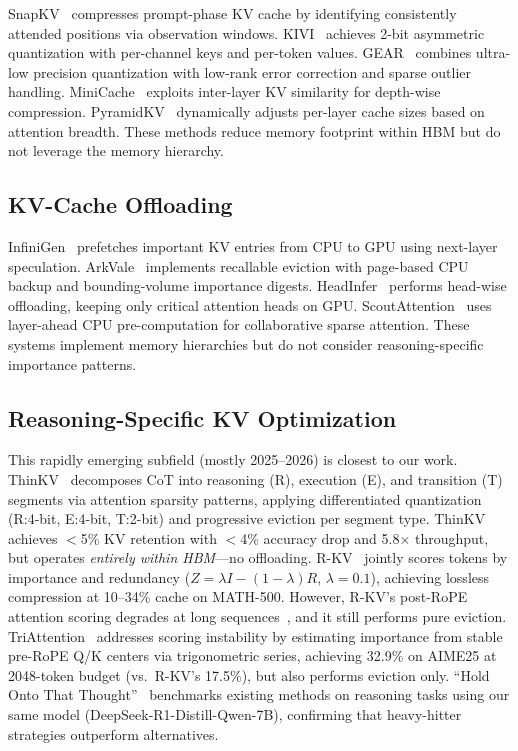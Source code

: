 \documentclass{article}
\begin{document}
SnapKV~\cite{snapkv} compresses prompt-phase KV cache by identifying consistently attended positions via observation windows.
KIVI~\cite{kivi} achieves 2-bit asymmetric quantization with per-channel keys and per-token values.
GEAR~\cite{gear} combines ultra-low precision quantization with low-rank error correction and sparse outlier handling.
MiniCache~\cite{minicache} exploits inter-layer KV similarity for depth-wise compression.
PyramidKV~\cite{pyramidkv} dynamically adjusts per-layer cache sizes based on attention breadth.
These methods reduce memory footprint within HBM but do not leverage the memory hierarchy.

\subsection{KV-Cache Offloading}

InfiniGen~\cite{infinigen} prefetches important KV entries from CPU to GPU using next-layer speculation.
ArkVale~\cite{arkvale} implements recallable eviction with page-based CPU backup and bounding-volume importance digests.
HeadInfer~\cite{headinfer} performs head-wise offloading, keeping only critical attention heads on GPU.
ScoutAttention~\cite{scoutattention} uses layer-ahead CPU pre-computation for collaborative sparse attention.
These systems implement memory hierarchies but do not consider reasoning-specific importance patterns.

\subsection{Reasoning-Specific KV Optimization}

This rapidly emerging subfield (mostly 2025--2026) is closest to our work.
ThinKV~\cite{thinkv} decomposes CoT into reasoning (R), execution (E), and transition (T) segments via attention sparsity patterns, applying differentiated quantization (R:4-bit, E:4-bit, T:2-bit) and progressive eviction per segment type.
ThinKV achieves $<$5\% KV retention with $<$4\% accuracy drop and 5.8$\times$ throughput, but operates \emph{entirely within HBM}---no offloading.
R-KV~\cite{rkv} jointly scores tokens by importance and redundancy ($Z = \lambda I - (1{-}\lambda)R$, $\lambda{=}0.1$), achieving lossless compression at 10--34\% cache on MATH-500.
However, R-KV's post-RoPE attention scoring degrades at long sequences~\cite{triattention}, and it still performs pure eviction.
TriAttention~\cite{triattention} addresses scoring instability by estimating importance from stable pre-RoPE Q/K centers via trigonometric series, achieving 32.9\% on AIME25 at 2048-token budget (vs.\ R-KV's 17.5\%), but also performs eviction only.
``Hold Onto That Thought''~\cite{holdonto} benchmarks existing methods on reasoning tasks using our same model (DeepSeek-R1-Distill-Qwen-7B), confirming that heavy-hitter strategies outperform alternatives.
\end{document}
